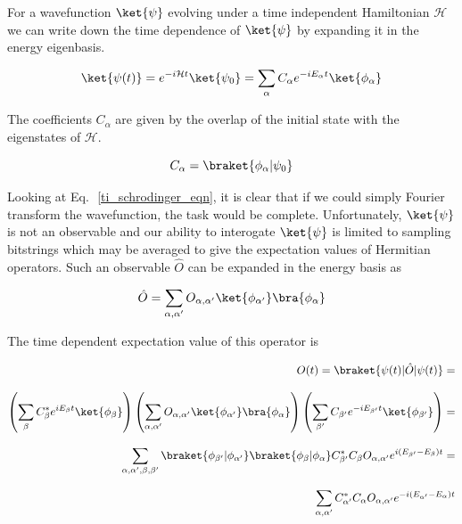 For a wavefunction $\ket{\psi}$ evolving under a time independent Hamiltonian $\mathcal{H}$ we can write down the time dependence of $\ket{\psi}$ by expanding it in the
energy eigenbasis.

\begin{equation}
    \ket{\psi (t)} =e^{-i \mathcal{H} t} \ket{\psi_{0}} = \sum_{\alpha} C_{\alpha} e^{-i E_{\alpha} t} \ket{\phi_{\alpha}}
    \label{ti_schrodinger_eqn}
\end{equation}

\noindent The coefficients $C_{\alpha}$ are given by the overlap of the initial state with the eigenstates of $\mathcal{H}$.

\begin{equation}
    C_{\alpha} = \braket{\phi_{\alpha}|\psi_{0}}
\end{equation}

\noindent Looking at Eq.\,~\ref{ti_schrodinger_eqn}, it is clear that if we could simply Fourier transform the wavefunction, the task would be complete.
Unfortunately, $\ket{\psi}$ is not an observable and our ability to interogate $\ket{\psi}$ is limited to sampling bitstrings which may be averaged
to give the expectation values of Hermitian operators.  Such an observable $\hat{O}$ can be expanded in the energy basis as

\begin{equation}
    \label{observable}
    \hat{O} = \sum_{\alpha,\alpha^{\prime}} O_{\alpha,\alpha^{\prime}} \ket{\phi_{\alpha^{\prime}}} \bra{\phi_{\alpha}}
\end{equation}

\noindent The time dependent expectation value of this operator is

\begin{equation*}
    \label{derive_energy_differences}
    \begin{aligned}
        O(t) =\braket{\psi(t)|\hat{O}|\psi(t)} = \\[2.0ex]
        \left( \sum_{\beta} C^{*}_{\beta} e^{i E_{\beta} t} \ket{\phi_{\beta}} \right)
        \left( \sum_{\alpha,\alpha^{\prime}} O_{\alpha,\alpha^{\prime}} \ket{\phi_{\alpha^{\prime}}} \bra{\phi_{\alpha}} \right)
        \left( \sum_{\beta^{\prime}} C_{\beta^{\prime}} e^{- i E_{\beta^{\prime}} t} \ket{\phi_{\beta^{\prime}}} \right) = \\[2.0ex]
        \sum_{\alpha, \alpha^{\prime}, \beta, \beta^{\prime} }
        \braket{\phi_{\beta^{\prime}}|\phi_{\alpha^{\prime}}}
        \braket{\phi_{\beta}|\phi_{\alpha}}
        C_{\beta^{\prime}}^{*} C_{\beta} O_{\alpha, \alpha^{\prime}} e^{i (E_{\beta^\prime} - E_{\beta}) t} = \\[2.0ex]
        \sum_{\alpha, \alpha^{\prime}} C^{*}_{\alpha^{\prime}} C_{\alpha} O_{\alpha, \alpha^{\prime}} e^{- i (E_{\alpha^{\prime}} - E_{\alpha}) t}
    \end{aligned}
\end{equation*}

